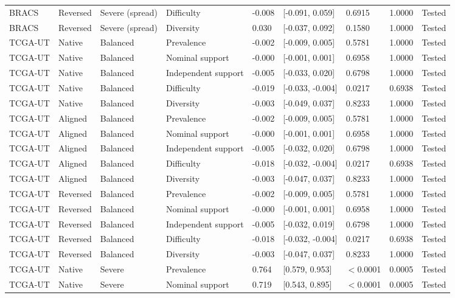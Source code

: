 \begin{longtable}{lllllllll}
BRACS & Reversed & Severe (spread) & Difficulty & -0.008 & [-0.091, 0.059] & 0.6915 & 1.0000 & Tested \\
BRACS & Reversed & Severe (spread) & Diversity & 0.030 & [-0.037, 0.092] & 0.1580 & 1.0000 & Tested \\
TCGA-UT & Native & Balanced & Prevalence & -0.002 & [-0.009, 0.005] & 0.5781 & 1.0000 & Tested \\
TCGA-UT & Native & Balanced & Nominal support & -0.000 & [-0.001, 0.001] & 0.6958 & 1.0000 & Tested \\
TCGA-UT & Native & Balanced & Independent support & -0.005 & [-0.033, 0.020] & 0.6798 & 1.0000 & Tested \\
TCGA-UT & Native & Balanced & Difficulty & -0.019 & [-0.033, -0.004] & 0.0217 & 0.6938 & Tested \\
TCGA-UT & Native & Balanced & Diversity & -0.003 & [-0.049, 0.037] & 0.8233 & 1.0000 & Tested \\
TCGA-UT & Aligned & Balanced & Prevalence & -0.002 & [-0.009, 0.005] & 0.5781 & 1.0000 & Tested \\
TCGA-UT & Aligned & Balanced & Nominal support & -0.000 & [-0.001, 0.001] & 0.6958 & 1.0000 & Tested \\
TCGA-UT & Aligned & Balanced & Independent support & -0.005 & [-0.032, 0.020] & 0.6798 & 1.0000 & Tested \\
TCGA-UT & Aligned & Balanced & Difficulty & -0.018 & [-0.032, -0.004] & 0.0217 & 0.6938 & Tested \\
TCGA-UT & Aligned & Balanced & Diversity & -0.003 & [-0.047, 0.037] & 0.8233 & 1.0000 & Tested \\
TCGA-UT & Reversed & Balanced & Prevalence & -0.002 & [-0.009, 0.005] & 0.5781 & 1.0000 & Tested \\
TCGA-UT & Reversed & Balanced & Nominal support & -0.000 & [-0.001, 0.001] & 0.6958 & 1.0000 & Tested \\
TCGA-UT & Reversed & Balanced & Independent support & -0.005 & [-0.032, 0.019] & 0.6798 & 1.0000 & Tested \\
TCGA-UT & Reversed & Balanced & Difficulty & -0.018 & [-0.032, -0.004] & 0.0217 & 0.6938 & Tested \\
TCGA-UT & Reversed & Balanced & Diversity & -0.003 & [-0.047, 0.037] & 0.8233 & 1.0000 & Tested \\
TCGA-UT & Native & Severe & Prevalence & 0.764 & [0.579, 0.953] & $<$0.0001 & 0.0005 & Tested \\
TCGA-UT & Native & Severe & Nominal support & 0.719 & [0.543, 0.895] & $<$0.0001 & 0.0005 & Tested \\

\end{longtable}
